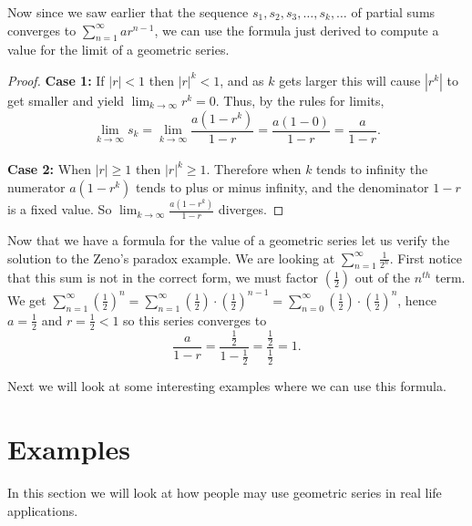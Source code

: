 Now since we saw earlier that the sequence $s_{1}, s_{2}, s_{3},
\ldots, s_{k}, \ldots$ of partial sums converges to
$\displaystyle{\sum_{n=1}^{\infty} ar^{n-1}}$, we can use the
formula just derived to compute a value for the limit of a geometric series.

\begin{center}
\end{center}
\begin{proof}
\textbf{Case 1:} If $|r|<1$ then $|r|^{k} <1$, and as $k$ gets
larger this will cause $|r^{k}|$ to get smaller and yield
$\displaystyle\lim_{k \rightarrow \infty} r^{k}=0$. Thus, by the rules for
limits,
\[
\lim_{k\to\infty} s_k=
\lim_{k \rightarrow \infty} \frac{a (1-r^{k})}{1-r} =
\frac{a(1-0)}{1-r}=\frac{a}{1-r}.
\]
\\
\textbf{Case 2:} When $|r| \geq 1$ then $|r|^{k} \geq
1$. Therefore when $k$ tends to infinity the numerator $a(1-r^{k})$
tends to plus or minus infinity, and the denominator $1-r$ is a fixed
value. So $\displaystyle{\lim_{k \rightarrow \infty}
\frac{a
(1-r^{k})}{1-r}}$ diverges.
\end{proof}

Now that we have a formula for the value of a geometric series let
us verify the solution to the Zeno's paradox example.  We are
looking at $\displaystyle{\sum_{n=1}^{\infty}\frac{1}{2^n}}$. First
notice that this sum is not in the correct form,  we must factor
$(\frac{1}{2})$ out of the $n^{th}$ term.  We get
$\displaystyle{\sum_{n=1}^{\infty} ( \frac{1}{2})^{n} =
\sum_{n=1}^{\infty}(\frac{1}{2})\cdot(\frac{1}{2})^{n-1}
=\sum_{n=0}^{\infty} (\frac{1}{2}) \cdot (\frac{1}{2})^{n}}$, hence
$a=\frac{1}{2}$ and $r=\frac{1}{2} < 1$ so this series converges to
\[
\frac{a}{1-r} =
\frac{\frac{1}{2}}{1-\frac{1}{2}}=\frac{\frac{1}{2}}{\frac{1}{2}}=1.
\]

Next we will look at some interesting examples where we can use this
formula.

\section*{Examples}
In this section we will look at how people may use geometric series
in real life applications.

